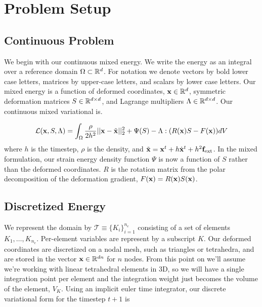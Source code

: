 \section{Problem Setup}

\subsection{Continuous Problem}
We begin with our continuous mixed energy. We write the energy as an integral over a reference domain $\Omega \subset \mathbb{R}^d$. For notation we denote vectors by bold lower case letters, matrices by upper-case letters, and scalars by lower case letters. Our mixed energy is a function of deformed coordinates, $\mathbf{x} \in \mathbb{R}^d$, symmetric deformation matrices $S \in \mathbb{R}^{d \times d}$, and Lagrange multipliers $\Lambda \in \mathbb{R}^{d \times d}$. Our continuous mixed variational is.  

\begin{equation}
\mathcal{L}(\mathbf{x},S,\Lambda) = \int_\Omega \frac{\rho}{2h^2} ||\mathbf{x} - \tilde{\mathbf{x}}||_2^2 
+ \Psi(S) - \Lambda : (R(\mathbf{x})S - F(\mathbf{x})) dV
\end{equation}
where $h$ is the timestep, $\rho$ is the density, and $\tilde{\mathbf{x}} = \mathbf{x}^t + h\dot{\mathbf{x}}^t + h^2 \mathbf{f}_\text{ext}$. In the mixed formulation, our strain energy density function $\Psi$ is now a function of $S$ rather than the deformed coordinates. $R$ is the rotation matrix from the polar decomposition of the deformation gradient, $F(\mathbf{x}) = R(\mathbf{x})S(\mathbf{x})$. 

\subsection{Discretized Energy}

We represent the domain by $\mathcal{T} \equiv \{K_i\}_{i=1}^{n_e}$ consisting of a set of elements $K_1,\dots,K_{n_e}$.
Per-element variables are represent by a subscript $K$. Our deformed coordinates are discretized on a nodal mesh, such as triangles or tetrahedra, and are stored in the vector $\mathbf{x} \in \mathbb{R}^{dn}$ for $n$ nodes.
From this point on we'll assume we're working with linear tetrahedral elements in 3D, so we will have a single integration point per element and the integration weight just becomes the volume of the element, $V_K$. Using an implicit euler time integrator, our discrete variational form for the timestep $t+1$ is

